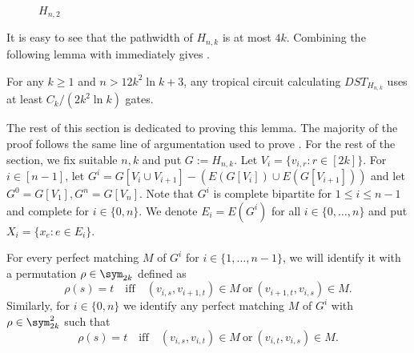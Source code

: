 \begin{figure}[h]

    \caption{$H_{n,2}$}
\end{figure}

It is easy to see that the pathwidth of $H_{n, k}$ is at most $4k$. Combining the following lemma with  immediately gives .

\begin{lemma}\label{lem:tc_dst}
    For any $k \geq 1$ and $n > 12k^2 \ln k + 3$, any tropical circuit calculating $DST_{H_{n, k}}$ uses at least
    $C_k / (2k^2 \ln k)$
    gates.
\end{lemma}

The rest of this section is dedicated to proving this lemma. The majority of the proof follows the same line of argumentation used to prove .
For the rest of the section, we fix suitable $n, k$ and put $G := H_{n, k}$. Let $V_i = \{v_{i, r} : r \in [2k]\}$. For $i \in [n - 1]$, let $G^i = G[V_i \cup V_{i + 1}] - (E(G[V_i]) \cup E(G[V_{i+1}]))$ and let $G^0 = G[V_1], G^n = G[V_n]$. Note that $G^i$ is complete bipartite for $1 \leq i \leq n - 1$ and complete for $i \in \{0, n\}$. We denote $E_i = E(G^i)$ for all $i \in \{0, \dots, n\}$ and put $X_i = \{x_e \colon e \in E_i\}$.

For every perfect matching $M$ of $G^i$ for $i \in \{1, \dots, n-1\}$, we will identify it with a permutation $\rho \in \sym_{2k}$ defined as
    $$
        \rho(s) = t \quad \text{iff} \quad (v_{i, s}, v_{i + 1, t}) \in M \ \text{or}\ (v_{i+1, t}, v_{i,s}) \in M.
    $$
    Similarly, for $i \in \{0, n\}$ we identify any perfect matching $M$ of $G^i$ with $\rho \in \sym_{2k}^2$ such that
    $$
        \rho(s) = t \quad \text{iff} \quad (v_{i, s}, v_{i, t}) \in M \ \text{or}\ (v_{i, t}, v_{i, s}) \in M.
    $$
    
